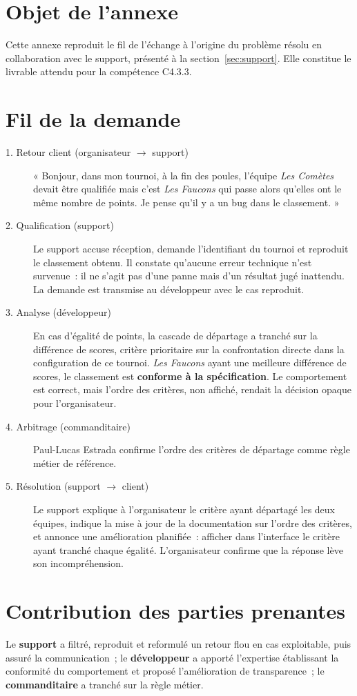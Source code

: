 \label{chap:annexe-support}
\section*{Objet de l'annexe}
Cette annexe reproduit le fil de l'échange à l'origine du problème résolu en collaboration avec le support, présenté à la section~\ref*{sec:support}. Elle constitue le livrable attendu pour la compétence C4.3.3.

\section*{Fil de la demande}
\begin{description}
    \item[1. Retour client (organisateur $\rightarrow$ support)] « Bonjour, dans mon tournoi, à la fin des poules, l'équipe \emph{Les Comètes} devait être qualifiée mais c'est \emph{Les Faucons} qui passe alors qu'elles ont le même nombre de points. Je pense qu'il y a un bug dans le classement. »
    \item[2. Qualification (support)] Le support accuse réception, demande l'identifiant du tournoi et reproduit le classement obtenu. Il constate qu'aucune erreur technique n'est survenue~: il ne s'agit pas d'une panne mais d'un résultat jugé inattendu. La demande est transmise au développeur avec le cas reproduit.
    \item[3. Analyse (développeur)] En cas d'égalité de points, la cascade de départage a tranché sur la différence de scores, critère prioritaire sur la confrontation directe dans la configuration de ce tournoi. \emph{Les Faucons} ayant une meilleure différence de scores, le classement est \textbf{conforme à la spécification}. Le comportement est correct, mais l'ordre des critères, non affiché, rendait la décision opaque pour l'organisateur.
    \item[4. Arbitrage (commanditaire)] Paul-Lucas Estrada confirme l'ordre des critères de départage comme règle métier de référence.
    \item[5. Résolution (support $\rightarrow$ client)] Le support explique à l'organisateur le critère ayant départagé les deux équipes, indique la mise à jour de la documentation sur l'ordre des critères, et annonce une amélioration planifiée~: afficher dans l'interface le critère ayant tranché chaque égalité. L'organisateur confirme que la réponse lève son incompréhension.
\end{description}

\section*{Contribution des parties prenantes}
Le \textbf{support} a filtré, reproduit et reformulé un retour flou en cas exploitable, puis assuré la communication~; le \textbf{développeur} a apporté l'expertise établissant la conformité du comportement et proposé l'amélioration de transparence~; le \textbf{commanditaire} a tranché sur la règle métier.

